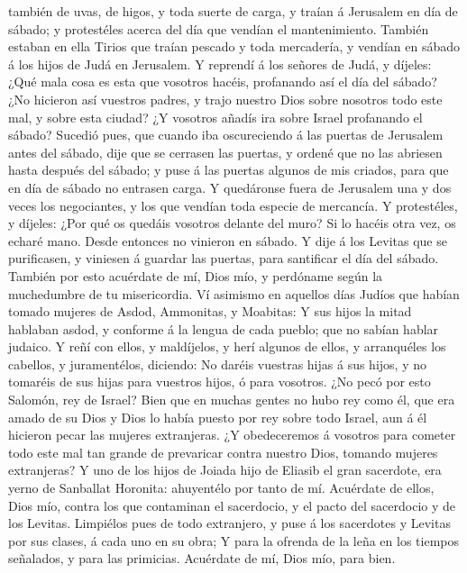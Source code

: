 también de uvas, de higos, y toda suerte de carga, y traían á Jerusalem
en día de sábado; y protestéles acerca del día que vendían el
mantenimiento.  También estaban en ella Tirios que traían
pescado y toda mercadería, y vendían en sábado á los hijos de Judá en
Jerusalem.  Y reprendí á los señores de Judá, y díjeles:
¿Qué mala cosa es esta que vosotros hacéis, profanando así el día del
sábado?  ¿No hicieron así vuestros padres, y trajo
nuestro Dios sobre nosotros todo este mal, y sobre esta ciudad? ¿Y
vosotros añadís ira sobre Israel profanando el sábado? 
Sucedió pues, que cuando iba oscureciendo á las puertas de Jerusalem
antes del sábado, dije que se cerrasen las puertas, y ordené que no las
abriesen hasta después del sábado; y puse á las puertas algunos de mis
criados, para que en día de sábado no entrasen carga.  Y
quedáronse fuera de Jerusalem una y dos veces los negociantes, y los que
vendían toda especie de mercancía.  Y protestéles, y
díjeles: ¿Por qué os quedáis vosotros delante del muro? Si lo hacéis
otra vez, os echaré mano. Desde entonces no vinieron en sábado.
 Y dije á los Levitas que se purificasen, y viniesen á
guardar las puertas, para santificar el día del sábado. También por esto
acuérdate de mí, Dios mío, y perdóname según la muchedumbre de tu
misericordia.  Ví asimismo en aquellos días Judíos que
habían tomado mujeres de Asdod, Ammonitas, y Moabitas:  Y
sus hijos la mitad hablaban asdod, y conforme á la lengua de cada
pueblo; que no sabían hablar judaico.  Y reñí con ellos,
y maldíjelos, y herí algunos de ellos, y arranquéles los cabellos, y
juramentélos, diciendo: No daréis vuestras hijas á sus hijos, y no
tomaréis de sus hijas para vuestros hijos, ó para vosotros.
 ¿No pecó por esto Salomón, rey de Israel? Bien que en
muchas gentes no hubo rey como él, que era amado de su Dios y Dios lo
había puesto por rey sobre todo Israel, aun á él hicieron pecar las
mujeres extranjeras.  ¿Y obedeceremos á vosotros para
cometer todo este mal tan grande de prevaricar contra nuestro Dios,
tomando mujeres extranjeras?  Y uno de los hijos de
Joiada hijo de Eliasib el gran sacerdote, era yerno de Sanballat
Horonita: ahuyentélo por tanto de mí.  Acuérdate de
ellos, Dios mío, contra los que contaminan el sacerdocio, y el pacto del
sacerdocio y de los Levitas.  Limpiélos pues de todo
extranjero, y puse á los sacerdotes y Levitas por sus clases, á cada uno
en su obra;  Y para la ofrenda de la leña en los tiempos
señalados, y para las primicias. Acuérdate de mí, Dios mío, para bien.
